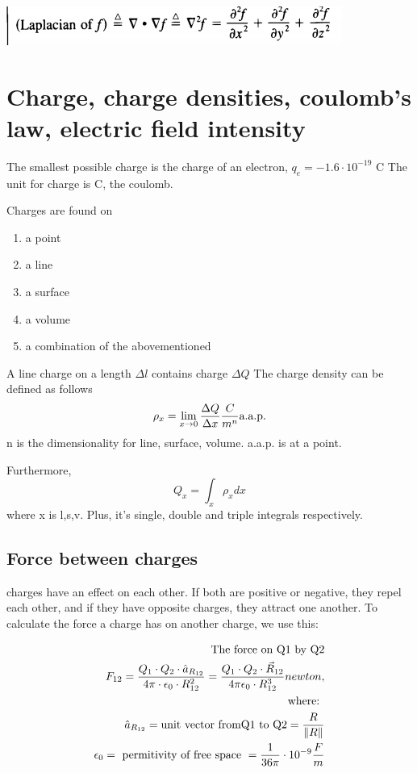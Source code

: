 \documentclass[12pt]{extarticle} %
\begin{document}
\includegraphics{1}

\newpage
\section{Charge, charge densities, coulomb's law, electric field intensity}
The smallest possible charge is the charge of an electron, $q_e = -1.6 \cdot 10^{-19}$ C
The unit for charge is C, the coulomb.

Charges are found on 
\begin{enumerate}  
    \item a point 
    \item a line
    \item a surface
    \item a volume
    \item a combination of the abovementioned
\end{enumerate}

A line charge on a length $\Delta l$ contains charge $\Delta Q$
The charge density can be defined as follows
$$
\rho_x = \lim_{x \rightarrow 0} {\Delta Q \over \Delta x } {C\over m^n} \text{a.a.p.}
$$
n is the dimensionality for line, surface, volume.
a.a.p. is at a point.

Furthermore, 
$$
Q_x = \int_x \rho_x dx
$$
where x is l,s,v. Plus, it's single, double and triple integrals respectively.

\subsection*{Force between charges}
charges have an effect on each other. If both are positive or negative, they repel each other,
and if they have opposite charges, they attract one another.
To calculate the force a charge has on another charge, we use this:

$$
\begin{aligned}
    \text{The force on Q1 by Q2} \\
    F_{12} =  { Q_1 \cdot Q_2 \cdot \hat{a}_{R_{12}} \over 4 \pi \cdot \epsilon_0 \cdot R_{12}^2} = 
    {Q_1 \cdot Q_2 \cdot \vec{R}_{12} \over 4 \pi \epsilon_0 \cdot R_{12}^3} newton, \\
    \text{where: } \\
    \hat{a}_{R_{12}} = \text{unit vector fromQ1 to Q2} = {R \over \left\Vert R \right\Vert} \\
    \epsilon_0 = \text{ permitivity of free space } = {1\over 36 \pi} \cdot 10^{-9} {F \over m}  
\end{aligned}
$$
\end{document}
